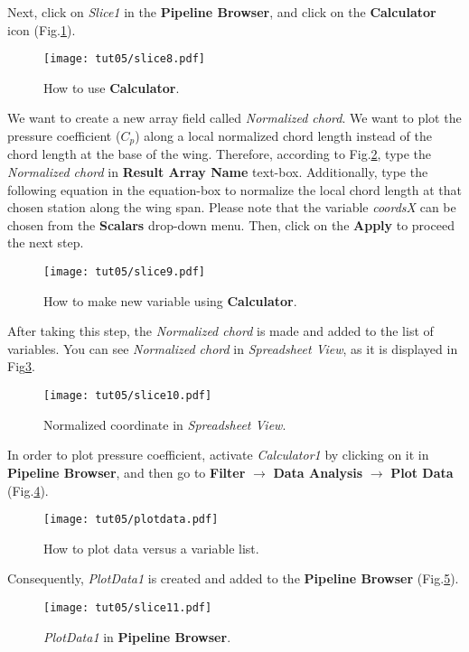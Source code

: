 Next, click on \textit{Slice1} in the \textbf{Pipeline Browser}, and click on the \textbf{Calculator} icon (Fig.\ref{fig5:slice8}).
\begin{figure}[htbp]
    \centering
    \texttt{[image: tut05/slice8.pdf]}
    \caption{How to use \textbf{Calculator}.}
    \label{fig5:slice8}
\end{figure}
We want to create a new array field called \textit{Normalized chord}. We want to plot the pressure coefficient ($C_p$) along a local normalized chord length instead of the chord length at the base of the wing. Therefore, according to Fig.\ref{fig5:slice9}, type the \textit{Normalized chord} in \textbf{Result Array Name} text-box. Additionally, type the following equation in the equation-box to normalize the local chord length at that chosen station along the wing span. Please note that the variable \textit{coordsX} can be chosen from the \textbf{Scalars} drop-down menu. Then, click on the \textbf{Apply} to proceed the next step.
\begin{figure}[htbp]
    \centering
    \texttt{[image: tut05/slice9.pdf]}
    \caption{How to make new variable using \textbf{Calculator}.}
    \label{fig5:slice9}
\end{figure}
After taking this step, the \textit{Normalized chord} is made and added to the list of variables. You can see \textit{Normalized chord} in \textit{Spreadsheet View}, as it is displayed in Fig\ref{fig5:slice10}.
\begin{figure}[htbp]
    \centering
    \texttt{[image: tut05/slice10.pdf]}
    \caption{Normalized coordinate in \textit{Spreadsheet View}.}
    \label{fig5:slice10}
\end{figure}

In order to plot pressure coefficient, activate \textit{Calculator1} by clicking on it in \textbf{Pipeline Browser}, and then go to \textbf{Filter} $\rightarrow$ \textbf{Data Analysis} $\rightarrow$ \textbf{Plot Data} (Fig.\ref{fig5:plotdata5}).
\begin{figure}[htbp]
    \centering
    \texttt{[image: tut05/plotdata.pdf]}
    \caption{How to plot data versus a variable list.}
    \label{fig5:plotdata5}
\end{figure}
Consequently, \textit{PlotData1} is created and added to the \textbf{Pipeline Browser} (Fig.\ref{fig5:slice11}).
\begin{figure}[htbp]
    \centering
    \texttt{[image: tut05/slice11.pdf]}
    \caption{\textit{PlotData1} in \textbf{Pipeline Browser}.}
    \label{fig5:slice11}
\end{figure}

